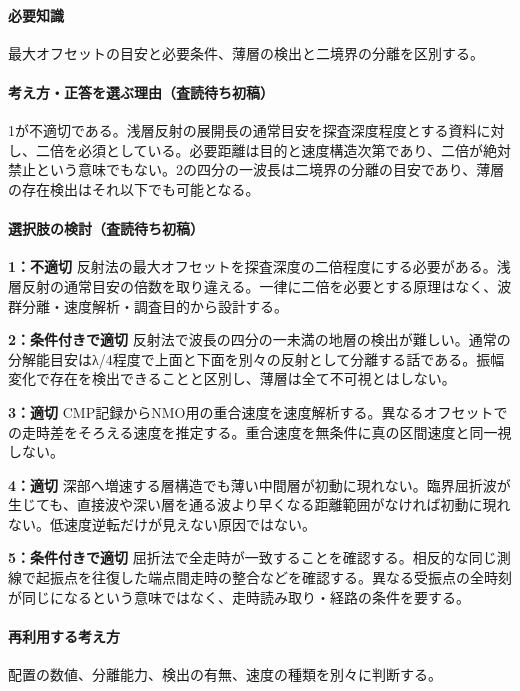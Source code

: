 \paragraph{必要知識} 最大オフセットの目安と必要条件、薄層の検出と二境界の分離を区別する。

\paragraph{考え方・正答を選ぶ理由（査読待ち初稿）} 1が不適切である。浅層反射の展開長の通常目安を探査深度程度とする資料に対し、二倍を必須としている。必要距離は目的と速度構造次第であり、二倍が絶対禁止という意味でもない。2の四分の一波長は二境界の分離の目安であり、薄層の存在検出はそれ以下でも可能となる。

\paragraph{選択肢の検討（査読待ち初稿）}\mbox{}\par

\noindent\textbf{1：不適切} 反射法の最大オフセットを探査深度の二倍程度にする必要がある。浅層反射の通常目安の倍数を取り違える。一律に二倍を必要とする原理はなく、波群分離・速度解析・調査目的から設計する。\par

\noindent\textbf{2：条件付きで適切} 反射法で波長の四分の一未満の地層の検出が難しい。通常の分解能目安はλ/4程度で上面と下面を別々の反射として分離する話である。振幅変化で存在を検出できることと区別し、薄層は全て不可視とはしない。\par

\noindent\textbf{3：適切} CMP記録からNMO用の重合速度を速度解析する。異なるオフセットでの走時差をそろえる速度を推定する。重合速度を無条件に真の区間速度と同一視しない。\par

\noindent\textbf{4：適切} 深部へ増速する層構造でも薄い中間層が初動に現れない。臨界屈折波が生じても、直接波や深い層を通る波より早くなる距離範囲がなければ初動に現れない。低速度逆転だけが見えない原因ではない。\par

\noindent\textbf{5：条件付きで適切} 屈折法で全走時が一致することを確認する。相反的な同じ測線で起振点を往復した端点間走時の整合などを確認する。異なる受振点の全時刻が同じになるという意味ではなく、走時読み取り・経路の条件を要する。\par

\paragraph{再利用する考え方} 配置の数値、分離能力、検出の有無、速度の種類を別々に判断する。

